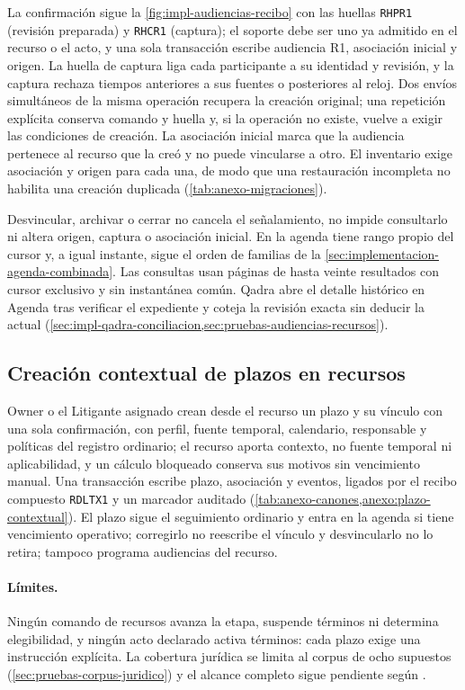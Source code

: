 La confirmación sigue la \cref{fig:impl-audiencias-recibo} con las huellas \texttt{RHPR1} (revisión preparada) y \texttt{RHCR1} (captura); el soporte debe ser uno ya admitido en el recurso o el acto, y una sola transacción escribe audiencia R1, asociación inicial y origen. La huella de captura liga cada participante a su identidad y revisión, y la captura rechaza tiempos anteriores a sus fuentes o posteriores al reloj. Dos envíos simultáneos de la misma operación recupera la creación original; una repetición explícita conserva comando y huella y, si la operación no existe, vuelve a exigir las condiciones de creación. La asociación inicial marca que la audiencia pertenece al recurso que la creó y no puede vincularse a otro. El inventario exige asociación y origen para cada una, de modo que una restauración incompleta no habilita una creación duplicada (\cref{tab:anexo-migraciones}).

Desvincular, archivar o cerrar no cancela el señalamiento, no impide consultarlo ni altera origen, captura o asociación inicial. En la agenda tiene rango propio del cursor y, a igual instante, sigue el orden de familias de la \cref{sec:implementacion-agenda-combinada}. Las consultas usan páginas de hasta veinte resultados con cursor exclusivo y sin instantánea común. Qadra abre el detalle histórico en Agenda tras verificar el expediente y coteja la revisión exacta sin deducir la actual (\cref{sec:impl-qadra-conciliacion,sec:pruebas-audiencias-recursos}).

\subsection{Creación contextual de plazos en recursos}\label{sec:impl-plazo-contextual}

Owner o el Litigante asignado crean desde el recurso un plazo y su vínculo con una sola confirmación, con perfil, fuente temporal, calendario, responsable y políticas del registro ordinario; el recurso aporta contexto, no fuente temporal ni aplicabilidad, y un cálculo bloqueado conserva sus motivos sin vencimiento manual. Una transacción escribe plazo, asociación y eventos, ligados por el recibo compuesto \texttt{RDLTX1} y un marcador auditado (\cref{tab:anexo-canones,anexo:plazo-contextual}). El plazo sigue el seguimiento ordinario y entra en la agenda si tiene vencimiento operativo; corregirlo no reescribe el vínculo y desvincularlo no lo retira; tampoco programa audiencias del recurso.

\paragraph{Límites.} Ningún comando de recursos avanza la etapa, suspende términos ni determina elegibilidad, y ningún acto declarado activa términos: cada plazo exige una instrucción explícita. La cobertura jurídica se limita al corpus de ocho supuestos (\cref{sec:pruebas-corpus-juridico}) y el alcance completo sigue pendiente según .

